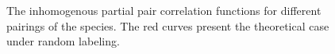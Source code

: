 \documentclass[12pt,a4paper,oneside,article]{memoir}
\begin{document}
\begin{figure}[htbp]
  \begin{adjustwidth}{-2in}{-2in}
	  \centering
  \end{adjustwidth}
  \caption{The inhomogenous partial pair correlation functions for different pairings of the 
  species. The red curves present the theoretical case under random labeling. }
  \label{fig:ppcfi}
\end{figure}
\end{document}

